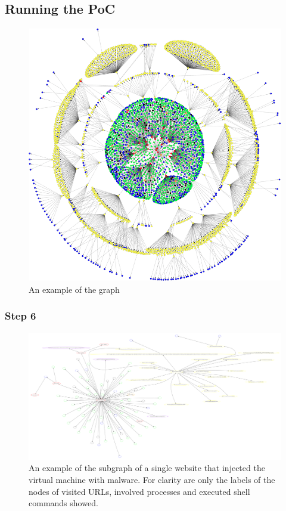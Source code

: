 \subsection{Running the PoC}
\begin{figure}[h]
    \centering
    \includegraphics[width=17cm]{Images/graph2.png}
    \caption{An example of the graph}
    \label{fig:graph}
\end{figure}
\subsubsection{Step 6}
\begin{figure}[h]
    \centering
    \includegraphics[width=25cm, angle=90]{Images/report_Subprocess_from_tab}
    \caption{An example of the subgraph of a single website that injected the virtual machine with malware. For clarity are only the labels of the nodes of visited URLs, involved processes and executed shell commands showed.}
    \label{fig:subgraph}
\end{figure}


